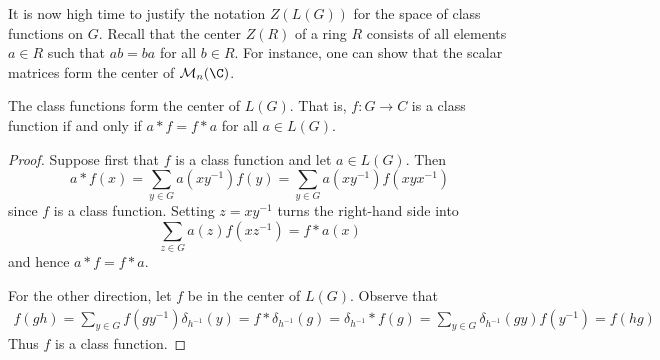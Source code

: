 It is now high time to justify the notation $Z(L(G))$ for the space of class
functions on $G$. Recall that the center $Z(R)$ of a ring $R$ consists of all elements $a\in R$ such that $ab=ba$ for all $b\in R$. For instance, one can show that the scalar matrices form the center of $\mathcal{M}_n(\C)$.
\begin{proposition}
The class functions form the center of $L(G)$. That is, $f:G\to C$ is a class function if and only if $a\ast f=f\ast a$ for all $a\in L(G)$.
\end{proposition}
\begin{proof}
Suppose first that $f$ is a class function and let $a\in L(G)$. Then
\[a\ast f(x)=\sum_{y\in G}a(xy^{-1})f(y)=\sum_{y\in G}a(xy^{-1})f(xyx^{-1})\]
since $f$ is a class function. Setting $z=xy^{-1}$ turns the right-hand side into
\[\sum_{z\in G}a(z)f(xz^{-1})=f\ast a(x)\]
and hence $a\ast f=f\ast a$.\par
For the other direction, let $f$ be in the center of $L(G)$. Observe that
\begin{align*}
f(gh)=\sum_{y\in G}f(gy^{-1})\delta_{h^{-1}}(y)=f\ast\delta_{h^{-1}}(g)=\delta_{h^{-1}}\ast f(g)=\sum_{y\in G}\delta_{h^{-1}}(gy)f(y^{-1})=f(hg)
\end{align*}
Thus $f$ is a class function.
\end{proof}

